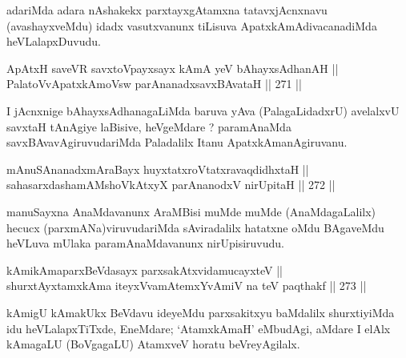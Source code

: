 \begin{artha}
adariMda adara nAshakekx parxtayxgAtamxna tatavxjAcnxnavu
(avashayxveMdu) idadx vasutxvanunx tiLisuva ApatxkAmAdivacanadiMda heVLalapxDuvudu.
\end{artha}


\begin{shl}
ApAtxH saveVR savxtoV\s payxsayx kAmA yeV bAhayxsAdhanAH || \\
PalatoV\s vApatxkAmoV\s sw parAnanadxsavxBAvataH \hfill || 271 ||  
\end{shl}

\begin{artha}
I jAcnxnige bAhayxsAdhanagaLiMda baruva yAva (PalagaLidadxrU)
avelalxvU savxtaH tAnAgiye laBisive, heVgeMdare ? paramAnaMda
savxBAvavAgiruvudariMda Paladalilx Itanu ApatxkAmanAgiruvanu.
\end{artha}


\begin{shl}
mAnuSAnanadxmAraBayx huyxtatxroVtatxravaqdidhxtaH || \\
sahasarxdashamAMshoVkAtxyX parAnanodxV nirUpitaH \hfill || 272 ||  
\end{shl}

\begin{artha}
manuSayxna AnaMdavanunx AraMBisi muMde muMde (AnaMdagaLalilx) hecucx
(parxmANa)viruvudariMda sAviradalilx hatatxne oMdu BAgaveMdu heVLuva
mUlaka paramAnaMdavanunx nirUpisiruvudu.
\end{artha}


\begin{shl}
kAmikAmaparxBeVdasayx parxsakAtxvidamucayxteV || \\
shurxtAyx\s \s tamxkAma iteyxVvamAtemxYvAmiV na teV paqthakf \hfill || 273 ||  
\end{shl}

\begin{artha}
kAmigU kAmakUkx BeVdavu ideyeMdu parxsakitxyu baMdalilx shurxtiyiMda
idu heVLalapxTiTxde, EneMdare; `AtamxkAmaH' eMbudAgi, aMdare I elAlx
kAmagaLU (BoVgagaLU) AtamxveV horatu beVreyAgilalx.
\end{artha}


